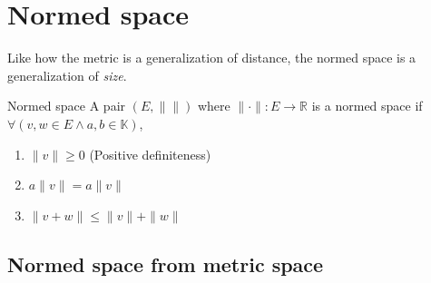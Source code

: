 \chapter{Normed space}

Like how the metric is a generalization of distance, the normed space is a generalization of \emph{size}.

\begin{df}{Normed space}{}
  A pair \((E, \|\|)\) where \(\|\mathord{\cdot}\| : E \to \mathbb{R}\) is a normed space if \(\forall (v, w \in E \land a, b \in \mathbb{K})\),
  \begin{enumerate}
    \item \(\|v\| \geq 0\) (Positive definiteness)
    \item \(a\|v\| = a\|v\|\)
    \item \(\|v + w\| \leq \|v\| + \|w\|\)
  \end{enumerate}
\end{df}

\section{Normed space from metric space}
